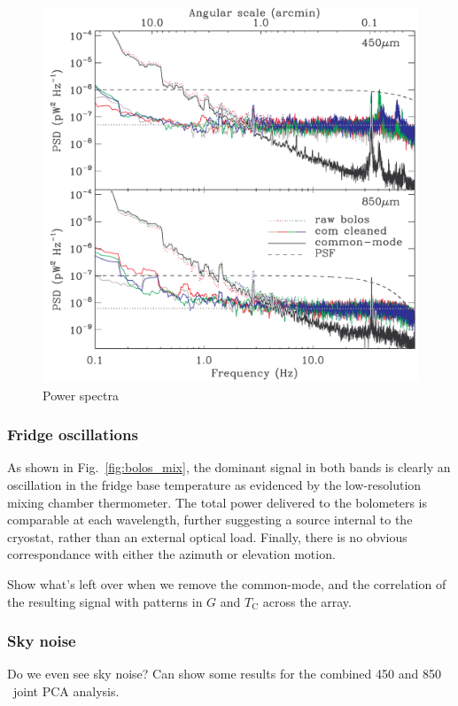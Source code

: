 \documentclass[useAMS,usenatbib,nofootinbib]{mn2e}
\begin{document}
\begin{figure}
\centering
\includegraphics[width=\linewidth]{pspec.pdf}
\caption{Power spectra}
\label{fig:pspec}
\end{figure}

\subsubsection{Fridge oscillations}
As shown in Fig.~\ref{fig:bolos_mix}, the dominant signal in both
bands is clearly an oscillation in the fridge base temperature as
evidenced by the low-resolution mixing chamber thermometer. The total
power delivered to the bolometers is comparable at each wavelength,
further suggesting a source internal to the cryostat, rather than an
external optical load. Finally, there is no obvious correspondance
with either the azimuth or elevation motion.

Show what's left over when we remove the common-mode, and the
correlation of the resulting signal with patterns in $G$ and
$T_\mathrm{C}$ across the array.

\subsubsection{Sky noise}
Do we even see sky noise? Can show some results for the combined 450
and 850\,\micron\ joint PCA analysis.
\end{document}
